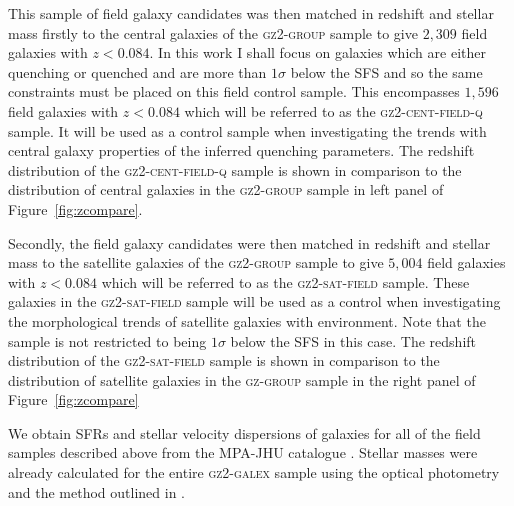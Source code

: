 This sample of field galaxy candidates was then matched in redshift and stellar mass firstly to the central galaxies of the \textsc{gz2-group} sample to give $2,309$ field galaxies with $z < 0.084$. In this work I shall focus on galaxies which are either quenching or quenched and are more than $1\sigma$ below the SFS and so the same constraints must be placed on this field control sample. This encompasses $1,596$ field galaxies with $z < 0.084$ which will be referred to as the \textsc{gz2-cent-field-q} sample. It will be used as a control sample when investigating the trends with central galaxy properties of the inferred quenching parameters. The redshift distribution of the \textsc{gz2-cent-field-q} sample is shown in comparison to the distribution of central galaxies in the \textsc{gz2-group} sample in left panel of Figure~\ref{fig:zcompare}. %

Secondly, the field galaxy candidates were then matched in redshift and stellar mass to the satellite galaxies of the \textsc{gz2-group} sample to give $5, 004$ field galaxies with $z < 0.084$ which will be referred to as the \textsc{gz2-sat-field} sample. These galaxies in the \textsc{gz2-sat-field} sample will be used as a control when investigating the morphological trends of satellite galaxies with environment. Note that the sample is not restricted to being $1\sigma$ below the SFS in this case. The redshift distribution of the \textsc{gz2-sat-field} sample is shown in comparison to the distribution of satellite galaxies in the \textsc{gz-group} sample in the right panel of Figure~\ref{fig:zcompare}

We obtain SFRs and stellar velocity dispersions of galaxies for all of the field samples described above from the MPA-JHU catalogue \citep{kauffmann03, brinchmann04}. Stellar masses were already calculated for the entire \textsc{gz2-galex} sample using the optical photometry and the method outlined in \citet[][see Section~\ref{sec:sample}]{Baldry06}.

